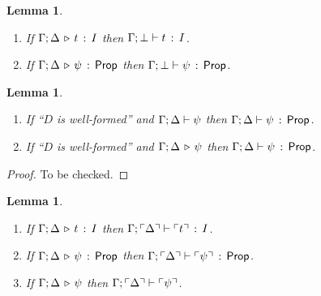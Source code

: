 \documentclass[10pt,a4paper]{article}
\newtheorem{lemma}[theorem]{Lemma}
\begin{document}
\begin{lemma}
  \label{lemma:l42}
  \mbox{}
  \begin{enumerate}
  \item If $\Gamma;\Delta \,\triangleright\, t\, :\, I$ then
    $\Gamma;\bot \vdash t\, :\, I$.
  \item If $\Gamma;\Delta \,\triangleright\, \psi\,:\, \mathsf{Prop}$ then
    $\Gamma;\bot \vdash \psi\, :\, \mathsf{Prop}$.
  \end{enumerate}
\end{lemma}

\begin{lemma}
  \label{lemma:wfproofs}
\mbox{}
\begin{enumerate}
\item If ``$D$ is well-formed'' and $\Gamma;\Delta \vdash \psi$ then
  $\Gamma;\Delta \vdash \psi\, :\, \mathsf{Prop}$.
\item If ``$D$ is well-formed'' and $\Gamma;\Delta \,\triangleright\, \psi$ then
  $\Gamma;\Delta \vdash \psi\, :\, \mathsf{Prop}$.
\end{enumerate}
\end{lemma}

\begin{proof}
  To be checked. 
\end{proof}

\begin{lemma}
  \label{lemma:l41}
  \mbox{}
  \begin{enumerate}
  \item If $\Gamma;\Delta \,\triangleright\, t\, :\, I$ then
    $\Gamma;\ulcorner \Delta \urcorner \vdash \ulcorner t \urcorner\, :\, I$.
  \item If $\Gamma;\Delta \,\triangleright\, \psi\,:\, \mathsf{Prop}$ then
    $\Gamma;\ulcorner \Delta \urcorner \vdash \ulcorner \psi \urcorner\, :\, \mathsf{Prop}$.
  \item If $\Gamma;\Delta \,\triangleright\, \psi$ then
    $\Gamma;\ulcorner \Delta \urcorner \vdash \ulcorner \psi \urcorner$.
  \end{enumerate}
\end{lemma}
\end{document}
